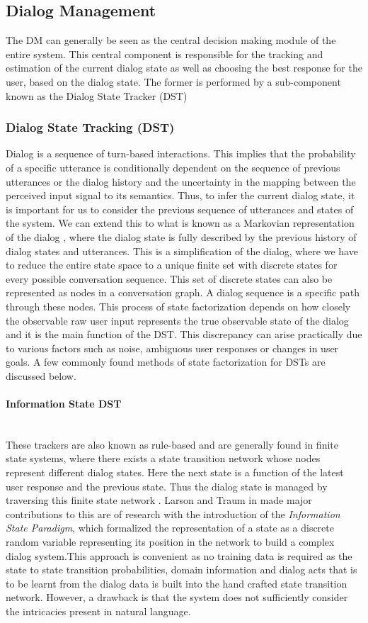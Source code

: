 \documentclass[14pt]{extarticle}
\newcommand{\myparagraph}[1]{\paragraph{#1}\mbox{}\\ \linebreak}
\numberwithin{equation}{section}
\begin{document}
	\subsection{Dialog Management}
	The DM can generally be seen as the central decision making module of the entire system. This central component is responsible for the tracking and estimation of the current dialog state as well as choosing the best response for the user, based on the dialog state. The former is performed by a sub-component known as the Dialog State Tracker (DST)
	\subsubsection{Dialog State Tracking (DST)}
	Dialog is a sequence of turn-based interactions. This implies that the probability of a specific utterance is conditionally dependent on the sequence of previous utterances or the dialog history and the uncertainty in the mapping between the perceived input signal to its semantics. Thus, to infer the current dialog state, it is important for us to consider the previous sequence of utterances and states of the system. We can extend this to what is known as a Markovian representation of the dialog \cite{mdp-bellmann}\cite{mdp-pieraccini}, where the dialog state is fully described by the previous history of dialog states and utterances. This is a simplification of the dialog, where we have to reduce the entire state space to a unique finite set with discrete states for every possible conversation sequence. This set of discrete states can also be represented as nodes in a conversation graph. A dialog sequence is a specific path through these nodes. This process of state factorization depends on how closely the observable raw user input represents the true observable state of the dialog and it is the main function of the DST. This discrepancy can arise practically due to various factors such as noise, ambiguous user responses or changes in user goals. A few commonly found methods of state factorization for DSTs are discussed below.
	\myparagraph{Information State DST}
	These trackers are also known as rule-based and are generally found in finite state systems, where there exists a state transition network whose nodes represent different dialog states. Here the next state is a function of the latest user response and the previous state. Thus the dialog state is managed by traversing this finite state network \cite{Sutton-introRL}. Larson and Traum in \cite{Larsson:2000:ISD:973935.973943} made major contributions to this are of research with the introduction of the \textit{Information State Paradigm}, which formalized the representation of a state as a discrete random variable representing its position in the network to build a complex dialog system.This approach is convenient as no training data is required as the state to state transition probabilities, domain information and dialog acts that is to be learnt from the dialog data is built into the hand crafted state transition network. However, a drawback is that the system does not sufficiently consider the intricacies present in natural language.
\end{document}
